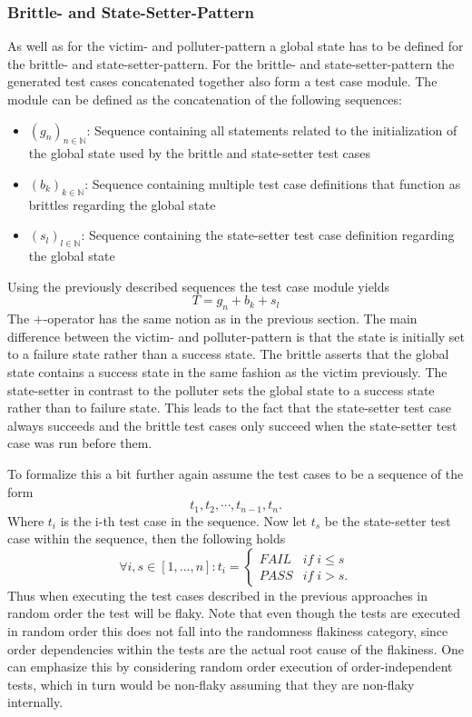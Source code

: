 \documentclass[
fancyheadings, %
%
%
]{stsreprt}
\begin{document}
\subsubsection{Brittle- and State-Setter-Pattern}
As well as for the victim- and polluter-pattern a global state has to be defined for the brittle- and state-setter-pattern. 
For the brittle- and state-setter-pattern the generated test cases concatenated together also form a test case module. 
The module can be defined as the concatenation of the following sequences:
\begin{itemize}
    \item $(g_n)_{n \in \mathbb{N}}$: Sequence containing all statements related to the initialization of the global state used by the brittle and state-setter test cases
    \item $(b_k)_{k \in \mathbb{N}}$: Sequence containing multiple test case definitions that function as brittles regarding the global state
    \item $(s_l)_{l \in \mathbb{N}}$: Sequence containing the state-setter test case definition regarding the global state
\end{itemize}

Using the previously described sequences the test case module yields 
\[
    T = g_n + b_k + s_l
\]
The $+$-operator has the same notion as in the previous section. The main difference between the victim- and polluter-pattern is that the state is initially set to a failure state rather than a success state. The brittle asserts that the global state contains a success state in the same fashion as the victim previously. The state-setter in contrast to the polluter sets the global state to a success state rather than to failure state. This leads to the fact that the state-setter test case always succeeds and the brittle test cases only succeed when the state-setter test case was run before them. \par
To formalize this a bit further again assume the test cases to be a sequence of the form
\[
    t_1, t_2, \cdots, t_{n-1}, t_n.
\]
Where $t_i$ is the i-th test case in the sequence. Now let $t_s$ be the state-setter test case within the sequence, then the following holds
\begin{equation*}
\forall i,s \in [1, ..., n]:
t_i=
    \begin{cases}
        FAIL  & if \; i \leq s  \\ 
        PASS  & if \; i > s.
    \end{cases}
\end{equation*}
Thus when executing the test cases described in the previous approaches in random order the test will be flaky. 
Note that even though the tests are executed in random order this does not fall into the randomness flakiness category, since order dependencies within the tests are the actual root cause of the flakiness. 
One can emphasize this by considering random order execution of order-independent tests, which in turn would be non-flaky assuming that they are non-flaky internally. \par
\end{document}
